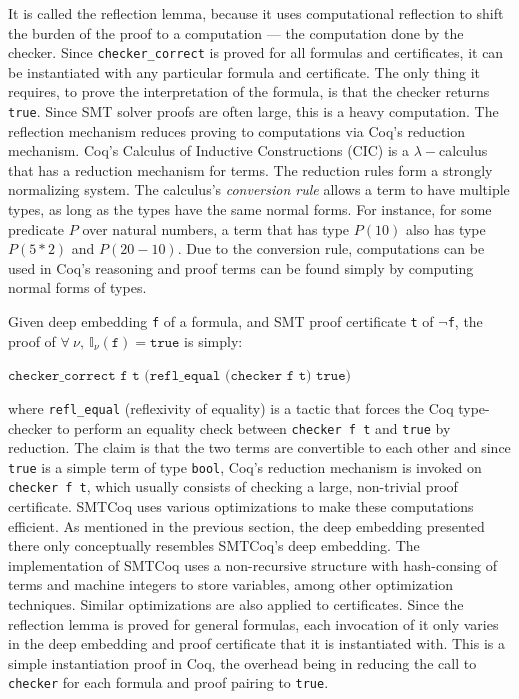 \documentclass[11pt]{article}
\begin{document}
\begin{enumerate}
		It is called the reflection 
		lemma, because it uses 
		computational reflection 
		to shift the burden of the 
		proof to a computation --- 
		the computation done by 
		the checker. Since 
		\texttt{checker\_correct}
		is proved for all formulas 
		and certificates, it can be 
		instantiated with any 
		particular formula and 
		certificate. The only thing it 
		requires, to 
		prove the interpretation of 
		the formula, is that the 
		checker
		returns \texttt{true}.
		Since SMT solver proofs are 
		often large, this is a 
		heavy computation. The
		reflection mechanism reduces
		proving to computations via 
		Coq's reduction mechanism.
		Coq's Calculus of Inductive 
		Constructions (CIC) is a 
		$\lambda-$calculus that has a 
		reduction mechanism for terms. The
		reduction rules form a strongly 
		normalizing system. The calculus's
		\textit{conversion rule} allows a 
		term to have multiple types, as long as 
		the types have the same normal forms. 
		For instance, for some predicate $P$ 
		over natural numbers, a term that 
		has type $P(10)$ also has type 
		$P(5*2)$ and $P(20-10)$. Due 
		to the conversion rule, 
		computations can be used in Coq's 
		reasoning and proof terms can be 
		found simply by computing normal 
		forms of types.
		
		Given 
		deep embedding \texttt{f}
		of a formula, and 
		SMT proof certificate \texttt{t} of 
		\texttt{$\neg$f}, the proof of $\forall\ \nu,\ 
		\mathbb{I}_{\nu}(\texttt{f}) = 
		\texttt{true}$ is simply:
		\begin{center}
			$\texttt{checker\_correct f t
				(refl\_equal (checker f t) true)}$
		\end{center}
		where \texttt{refl\_equal} 
		(reflexivity of equality) is a tactic
		that forces the Coq type-checker to 
		perform an equality check between 
		\texttt{checker f t} and 
		\texttt{true} by reduction. 
		The claim is that the two 
		terms are convertible to each other
		and since \texttt{true} is a simple 
		term of type \texttt{bool}, 
		Coq's reduction mechanism is 
		invoked on \texttt{checker f t},
		which usually consists of checking
		a large, non-trivial proof certificate. 
		SMTCoq uses various optimizations 
		to make these computations efficient.
		As mentioned in the previous section,
		the deep embedding presented there 
		only conceptually resembles SMTCoq's
		deep embedding. The implementation 
		of SMTCoq uses a non-recursive 
		structure with hash-consing of terms
		and machine integers to store variables,
		among other optimization techniques.
		Similar optimizations are also 
		applied to certificates.
		Since the reflection lemma is 
		proved for general formulas, 
		each invocation of it only varies
		in the deep embedding and proof 
		certificate that it is instantiated
		with. This is a simple instantiation
		proof in Coq, the overhead
		being in reducing the call to 
		\texttt{checker} for each 
		formula and proof pairing to 
		\texttt{true}.
\end{enumerate}
	
\end{document}
